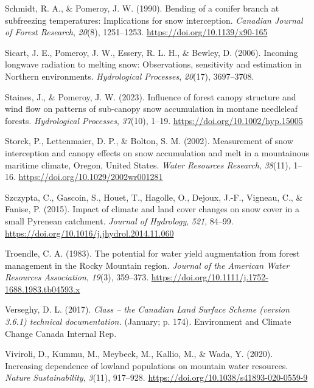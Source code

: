 \documentclass[
]{agujournal2019}
\newlength{\cslhangindent}
\newenvironment{CSLReferences}[2] %
 {\begin{list}{}{%
  \setlength{\itemindent}{0pt}
  \setlength{\leftmargin}{0pt}
  \setlength{\parsep}{0pt}
  \ifodd #1
   \setlength{\leftmargin}{\cslhangindent}
   \setlength{\itemindent}{-1\cslhangindent}
  \fi
  \setlength{\itemsep}{#2\baselineskip}}}
 {\end{list}}
\begin{document}
\begin{CSLReferences}{1}{0}
Schmidt, R. A., \& Pomeroy, J. W. (1990). Bending of a conifer branch at
subfreezing temperatures: Implications for snow interception.
\emph{Canadian Journal of Forest Research}, \emph{20}(8), 1251--1253.
\url{https://doi.org/10.1139/x90-165}

Sicart, J. E., Pomeroy, J. W., Essery, R. L. H., \& Bewley, D. (2006).
Incoming longwave radiation to melting snow: Observations, sensitivity
and estimation in {Northern} environments. \emph{Hydrological
Processes}, \emph{20}(17), 3697--3708.

Staines, J., \& Pomeroy, J. W. (2023). Influence of forest canopy
structure and wind flow on patterns of sub-canopy snow accumulation in
montane needleleaf forests. \emph{Hydrological Processes},
\emph{37}(10), 1--19. \url{https://doi.org/10.1002/hyp.15005}

Storck, P., Lettenmaier, D. P., \& Bolton, S. M. (2002). Measurement of
snow interception and canopy effects on snow accumulation and melt in a
mountainous maritime climate, {Oregon}, {United States}. \emph{Water
Resources Research}, \emph{38}(11), 1--16.
\url{https://doi.org/10.1029/2002wr001281}

Szczypta, C., Gascoin, S., Houet, T., Hagolle, O., Dejoux, J.-F.,
Vigneau, C., \& Fanise, P. (2015). Impact of climate and land cover
changes on snow cover in a small {Pyrenean} catchment. \emph{Journal of
Hydrology}, \emph{521}, 84--99.
\url{https://doi.org/10.1016/j.jhydrol.2014.11.060}

Troendle, C. A. (1983). The potential for water yield augmentation from
forest management in the {Rocky Mountain} region. \emph{Journal of the
American Water Resources Association}, \emph{19}(3), 359--373.
\url{https://doi.org/10.1111/j.1752-1688.1983.tb04593.x}

Verseghy, D. L. (2017). \emph{Class -- the {Canadian Land Surface
Scheme} (version 3.6.1) technical documentation.} (January; p. 174).
{Environment and Climate Change Canada Internal Rep.}

Viviroli, D., Kummu, M., Meybeck, M., Kallio, M., \& Wada, Y. (2020).
Increasing dependence of lowland populations on mountain water
resources. \emph{Nature Sustainability}, \emph{3}(11), 917--928.
\url{https://doi.org/10.1038/s41893-020-0559-9}


\end{CSLReferences}
\end{document}
